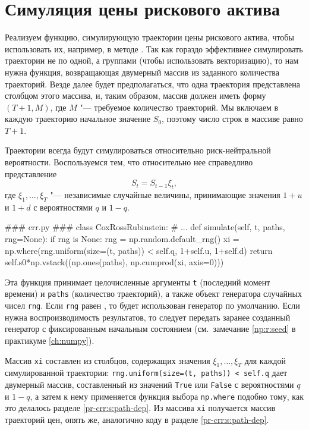 \section{Симуляция цены рискового актива}
Реализуем функцию, симулирующую траектории цены рискового актива, чтобы использовать их, например, в методе \mc.
Так как гораздо эффективнее симулировать траектории не по одной, а группами (чтобы использовать векторизацию), то нам нужна функция, возвращающая двумерный массив из заданного количества траекторий.
Везде далее будет предполагаться, что одна траектория представлена столбцом этого массива, и, таким образом, массив должен иметь форму $(T+1, M)$, где $M$ "--- требуемое количество траекторий.
Мы включаем в каждую траекторию начальное значение $S_0$, поэтому число строк в массиве равно $T+1$.

Траектории всегда будут симулироваться относительно риск-нейтральной вероятности. 
Воспользуемся тем, что относительно нее справедливо представление
\[
S_t = S_{t-1}\xi_t,
\]
где $\xi_1,\dots,\xi_T$ "--- независимые случайные величины, принимающие значения $1+u$ и $1+d$ с вероятностями $q$ и $1-q$.

\begin{python}
### crr.py ###
class CoxRossRubinstein:
    # ...
    def simulate(self, t, paths, rng=None):
        if rng is None:
            rng = np.random.default_rng()  
        xi = np.where(rng.uniform(size=(t, paths)) < self.q, 1+self.u, 1+self.d)
        return self.s0*np.vstack((np.ones(paths), np.cumprod(xi, axis=0)))
\end{python}
Эта функция принимает целочисленные аргументы \verb"t" (последний момент времени) и \verb"paths" (количество траекторий), а также объект генератора случайных чисел 
\verb"rng". Если \verb"rng" равен , то будет использован генератор по умолчанию.
Если нужна воспроизводимость результатов, то следует передать заранее созданный генератор с фиксированным начальным состоянием (см.~замечание \ref{np:r:seed} в практикуме \ref{ch:numpy}).

Массив \verb"xi" составлен из столбцов, содержащих значения $\xi_1,\dots,\xi_T$ для каждой симулированной траектории: \verb"rng.uniform(size=(t, paths)) < self.q" дает двумерный массив, составленный из значений \verb"True" или \verb"False" с вероятностями $q$ и $1-q$, а затем к нему применяется функция выбора \verb"np.where" подобно тому, как это делалось разделе \ref{pr-crr:s:path-dep}.
Из массива \verb"xi" получается массив траекторий цен, опять же, аналогично коду в разделе \ref{pr-crr:s:path-dep}.

